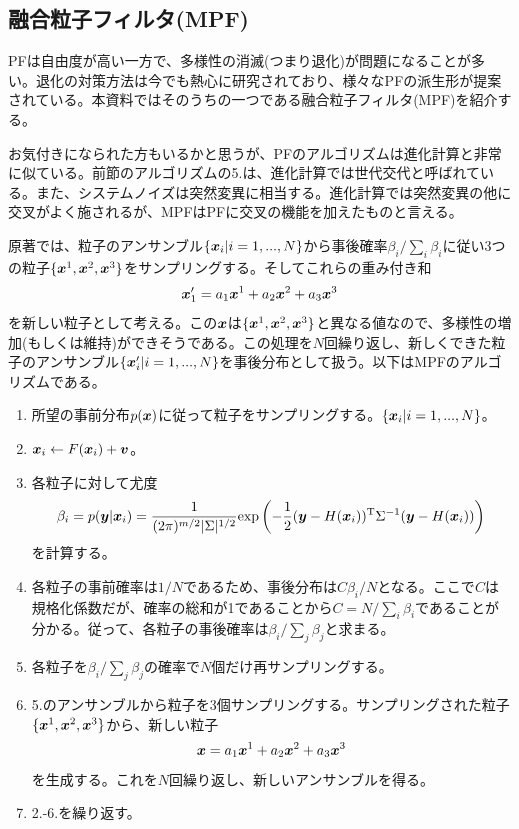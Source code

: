 \documentclass[dvipdfmx, 9pt, a4paper]{jsarticle}
\newcommand{\bm}[1]{{\mbox{\boldmath $#1$}}}
\begin{document}
\subsection{融合粒子フィルタ(MPF)}
PFは自由度が高い一方で、多様性の消滅(つまり退化)が問題になることが多い。退化の対策方法は今でも熱心に研究されており、様々なPFの派生形が提案されている。本資料ではそのうちの一つである融合粒子フィルタ(MPF)を紹介する。\par
お気付きになられた方もいるかと思うが、PFのアルゴリズムは進化計算と非常に似ている。前節のアルゴリズムの5.は、進化計算では世代交代と呼ばれている。また、システムノイズは突然変異に相当する。進化計算では突然変異の他に交叉がよく施されるが、MPFはPFに交叉の機能を加えたものと言える。\par
原著では、粒子のアンサンブル$\{ \bm x_i|i=1,...,N \}$から事後確率$\beta_i/\sum_i \beta_i$に従い3つの粒子$\{ \bm x^1, \bm x^2, \bm x^3 \}$をサンプリングする。そしてこれらの重み付き和
\begin{equation}
\bm x'_1=a_1\bm x^1+a_2\bm x^2+a_3\bm x^3 \notag
\end{equation}
を新しい粒子として考える。この$\bm x$は$\{ \bm x^1, \bm x^2, \bm x^3 \}$と異なる値なので、多様性の増加(もしくは維持)ができそうである。この処理を$N$回繰り返し、新しくできた粒子のアンサンブル$\{ \bm x'_i|i=1,...,N \}$を事後分布として扱う。以下はMPFのアルゴリズムである。
\begin{tcolorbox}[title=融合粒子フィルタ]
\begin{enumerate}
\item 所望の事前分布$p(\bm x)$に従って粒子をサンプリングする。$\{ \bm x_i|i=1,...,N \}$。
\item $\bm x_i \leftarrow F(\bm x_i)+\bm v$。
\item 各粒子に対して尤度
\begin{equation}
\beta_i=p(\bm y|\bm x_i)=\frac{1}{(2\pi)^{m/2}|\Sigma|^{1/2}}{\rm exp}\left(
-\frac{1}{2}(\bm y-H(\bm x_i))^{\rm T}\Sigma^{-1}(\bm y-H(\bm x_i))
\right) \notag
\end{equation}
を計算する。
\item 各粒子の事前確率は$1/N$であるため、事後分布は$C\beta_i/N$となる。ここで$C$は規格化係数だが、確率の総和が1であることから$C=N/\sum_i \beta_i$であることが分かる。従って、各粒子の事後確率は$\beta_i/\sum_j \beta_j$と求まる。
\item 各粒子を$\beta_i/\sum_j \beta_j$の確率で$N$個だけ再サンプリングする。
\item 5.のアンサンブルから粒子を3個サンプリングする。サンプリングされた粒子$\{ \bm x^1, \bm x^2, \bm x^3 \}$から、新しい粒子
\begin{equation}
\bm x=a_1\bm x^1+a_2\bm x^2+a_3\bm x^3
\end{equation}
を生成する。これを$N$回繰り返し、新しいアンサンブルを得る。
\item 2.-6.を繰り返す。
\end{enumerate}
\end{tcolorbox}
\end{document}
